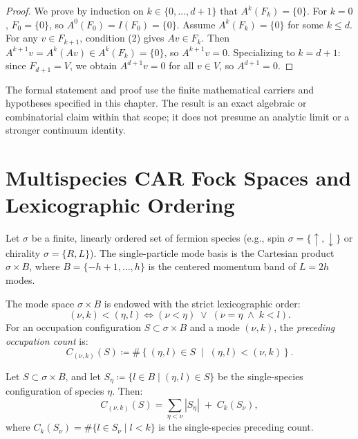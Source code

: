 \begin{proof}
We prove by induction on $k \in \{0, \dots, d+1\}$ that $A^k(F_k) = \{0\}$.
For $k = 0$, $F_0 = \{0\}$, so $A^0(F_0) = I(F_0) = \{0\}$.
Assume $A^k(F_k) = \{0\}$ for some $k \le d$.
For any $v \in F_{k+1}$, condition (2) gives $A v \in F_k$.
Then $A^{k+1} v = A^k(A v) \in A^k(F_k) = \{0\}$, so $A^{k+1} v = 0$.
Specializing to $k = d+1$: since $F_{d+1} = V$, we obtain $A^{d+1} v = 0$ for all $v \in V$, so $A^{d+1} = 0$.
\end{proof}

\begin{remark}
The formal statement and proof use the finite mathematical carriers and hypotheses specified in this chapter. The result is an exact algebraic or combinatorial claim within that scope; it does not presume an analytic limit or a stronger continuum identity.
\end{remark}

\section{Multispecies CAR Fock Spaces and Lexicographic Ordering}

Let $\sigma$ be a finite, linearly ordered set of fermion species (e.g., spin $\sigma = \{\uparrow, \downarrow\}$ or chirality $\sigma = \{R, L\}$).
The single-particle mode basis is the Cartesian product $\sigma \times B$, where $B = \{-h+1, \dots, h\}$ is the centered momentum band of $L = 2h$ modes.

\begin{definition}
\label{def:mode_order}
The mode space $\sigma \times B$ is endowed with the strict lexicographic order:
\begin{equation}
(\nu, k) < (\eta, l) \iff (\nu < \eta) \;\vee\; (\nu = \eta \;\wedge\; k < l).
\end{equation}
For an occupation configuration $S \subset \sigma \times B$ and a mode $(\nu, k)$, the \emph{preceding occupation count} is:
\begin{equation}
C_{(\nu, k)}(S) \coloneqq \#\left\{ (\eta, l) \in S \;\middle|\; (\eta, l) < (\nu, k) \right\}.
\end{equation}
\end{definition}

\begin{lemma}
\label{lem:preceding_count_split}
Let $S \subset \sigma \times B$, and let $S_\eta \coloneqq \{l \in B \mid (\eta, l) \in S\}$ be the single-species configuration of species $\eta$. Then:
\begin{equation}
\label{eq:preceding_count_split}
C_{(\nu, k)}(S) = \sum_{\eta < \nu} |S_\eta| \;+\; C_k(S_\nu),
\end{equation}
where $C_k(S_\nu) = \#\{l \in S_\nu \mid l < k\}$ is the single-species preceding count.
\end{lemma}

